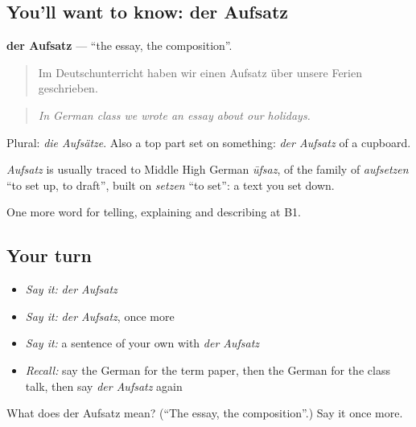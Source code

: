 \subsection*{You'll want to know: der Aufsatz}
\textbf{der Aufsatz} — \textquotedblleft{}the essay, the composition\textquotedblright{}.

\begin{quote}
Im Deutschunterricht haben wir einen Aufsatz über unsere Ferien geschrieben.
\end{quote}

\begin{quote}
\emph{In German class we wrote an essay about our holidays.}
\end{quote}

Plural: \emph{die Aufsätze}. Also a top part set on something: \emph{der Aufsatz} of a cupboard.

\begin{cousinweb}
\emph{Aufsatz} is usually traced to Middle High German \emph{ūfsaz}, of the family of \emph{aufsetzen} \textquotedblleft{}to set up, to draft\textquotedblright{}, built on \emph{setzen} \textquotedblleft{}to set\textquotedblright{}: a text you set down.
\end{cousinweb}

\begin{grammarlens}[title={What you've built}]
One more word for telling, explaining and describing at B1.
\end{grammarlens}

\subsection*{Your turn}
\begin{itemize}
\raggedright
  \item \emph{Say it:} \emph{der Aufsatz}
  \item \emph{Say it:} \emph{der Aufsatz}, once more
  \item \emph{Say it:} a sentence of your own with \emph{der Aufsatz}
  \item \emph{Recall:} say the German for the term paper, then the German for the class talk, then say \emph{der Aufsatz} again
\end{itemize}

\begin{tcolorbox}[breakable,colback=teal!4,colframe=teal!35!black,title={Before you move on}]
What does der Aufsatz mean? (\textquotedblleft{}The essay, the composition\textquotedblright{}.) Say it once more.
\end{tcolorbox}
